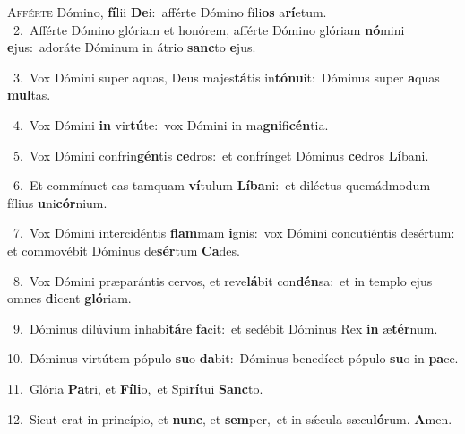 \lettrine{\initial\textcolor{\initialcolor}{A}}{fférte} Dómino, \textbf{fí}\-lii \textbf{De}\-i:~\star afférte Dómino fíli\textbf{os} a\-\textbf{rí}\-etum.\\
{\numbfont\textcolor{\numbcolor}{~2.}}~Afférte Dómino glóriam et honórem, afférte Dómino glóriam \textbf{nó}\-mini \textbf{e}\-jus:~\star adoráte Dóminum in átrio \textbf{sanc}\-to \textbf{e}\-jus.\par
{\numbfont\textcolor{\numbcolor}{~3.}}~Vox Dómini super aquas, Deus majes\-\textbf{tá}\-tis in\-\textbf{tó}\-\textbf{nu}it:~\star Dóminus super \textbf{a}\-quas \textbf{mul}\-tas.\par
{\numbfont\textcolor{\numbcolor}{~4.}}~Vox Dómini \textbf{in} vir\-\textbf{tú}\-te:~\star vox Dómini in ma\-\textbf{gni}\-fi\-\textbf{cén}\-tia.\par
{\numbfont\textcolor{\numbcolor}{~5.}}~Vox Dómini confrin\-\textbf{gén}\-tis \textbf{ce}\-dros:~\star et confrínget Dóminus \textbf{ce}\-dros \textbf{Lí}\-bani.\par
{\numbfont\textcolor{\numbcolor}{~6.}}~Et commínuet eas tamquam \textbf{ví}\-tulum \textbf{Lí}\-\textbf{ba}ni:~\star et diléctus quemádmodum fílius \textbf{u}\-ni\-\textbf{cór}\-nium.\par
{\numbfont\textcolor{\numbcolor}{~7.}}~Vox Dómini intercidéntis \textbf{flam}\-mam \textbf{i}\-gnis:~\star vox Dómini concutiéntis desértum: et commovébit Dóminus de\-\textbf{sér}\-tum \textbf{Ca}\-des.\par
{\numbfont\textcolor{\numbcolor}{~8.}}~Vox Dómini præparántis cervos, et reve\-\textbf{lá}\-bit con\-\textbf{dén}\-sa:~\star et in templo ejus omnes \textbf{di}\-cent \textbf{gló}\-riam.\par
{\numbfont\textcolor{\numbcolor}{~9.}}~Dóminus dilúvium inhabi\-\textbf{tá}\-re \textbf{fa}\-cit:~\star et sedébit Dóminus Rex \textbf{in} æ\-\textbf{tér}\-num.\par
{\numbfont\textcolor{\numbcolor}{10.}}~Dóminus virtútem pópulo \textbf{su}\-o \textbf{da}\-bit:~\star Dóminus benedícet pópulo \textbf{su}\-o in \textbf{pa}\-ce.\par
{\numbfont\textcolor{\numbcolor}{11.}}~Glória \textbf{Pa}\-tri, et \textbf{Fí}\-\textbf{li}o,~\star et Spi\-\textbf{rí}\-tui \textbf{Sanc}\-to.\par
{\numbfont\textcolor{\numbcolor}{12.}}~Sicut erat in princípio, et \textbf{nunc}\-, et \textbf{sem}\-per,~\star et in sǽcula sæcu\-\textbf{ló}\-rum. \textbf{A}\-men.\par
